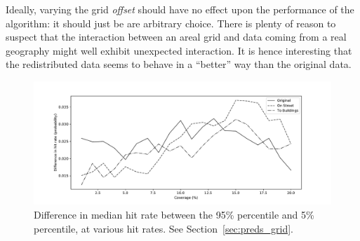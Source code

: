 \documentclass[twoside,a4paper,twocolumn,10pt]{article}
\theoremstyle{plain}
\theoremstyle{definition}
\begin{document}
Ideally, varying the grid \emph{offset} should have no effect upon the performance of
the algorithm: it should just be are arbitrary choice.  There is plenty of reason to suspect
that the interaction between an areal grid and data coming from a real geography might well
exhibit unexpected interaction.  It is hence interesting that the redistributed data seems
to behave in a ``better'' way than the original data.

\begin{figure}
  \includegraphics[width=\textwidth]{hit_rates_grid_vary.pdf}
  \caption{Difference in median hit rate between the 95\% percentile and 5\% percentile, at
  various hit rates.  See Section~\ref{sec:preds_grid}.}
  \label{fig:hit_rates_grid}
\end{figure}
\end{document}
